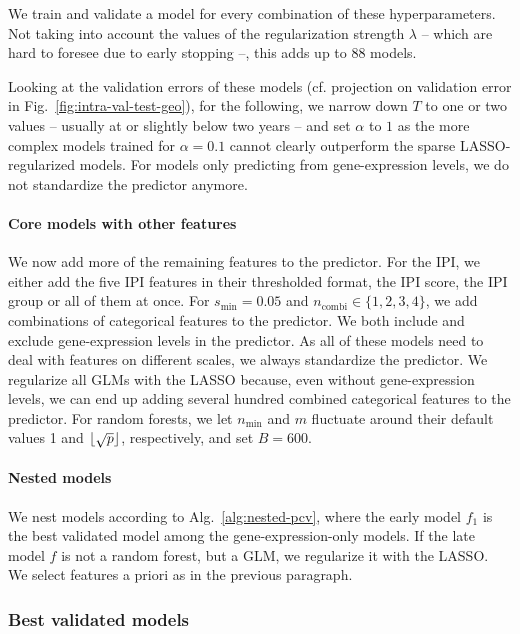 We train and validate a model for every combination of these hyperparameters.
Not taking into account the values of the regularization strength $\lambda$ -- which are hard to 
foresee due to early stopping --, this adds up to \num{88} models.

Looking at the validation errors of these models (cf. projection on validation error in Fig.\ 
\ref{fig:intra-val-test-geo}), for the following, we narrow down $T$ to one or 
two values -- usually at or slightly below two years -- and set $\alpha$ to $1$ as the more complex 
models trained for $\alpha = \num{0.1}$ cannot clearly outperform the sparse LASSO-regularized 
models. For models only predicting from gene-expression levels, we do not standardize the predictor 
anymore.

\paragraph{Core models with other features}
We now add more of the remaining features to the predictor. For the 
IPI, we either add the five IPI features in their thresholded format, the IPI score, the IPI group
or all of them at once. For $s_\text{min} = \num{0.05}$ 
and $n_\text{combi} \in \{1, 2, 3, 4 \}$, we add combinations of categorical features to the 
predictor. 
We both include and exclude gene-expression levels in the predictor.
As all of these models need to deal with features on different scales, we always 
standardize the predictor. We regularize all GLMs with the LASSO because, even without 
gene-expression levels, we can end up adding 
several hundred combined categorical features to the predictor. For random forests, we let 
$n_\text{min}$ and $m$ fluctuate around their default values \num{1} and $\lfloor\sqrt{p}\rfloor$, 
respectively, and set $B = \num{600}$.

\paragraph{Nested models}
We nest models according to Alg.\ \ref{alg:nested-pcv}, where the early model $f_1$ is the best 
validated model among the gene-expression-only models. If the late model $f$ is not a random 
forest, but a GLM, we regularize it with the LASSO. We select features a priori as in the previous 
paragraph.

\subsubsection{Best validated models}

